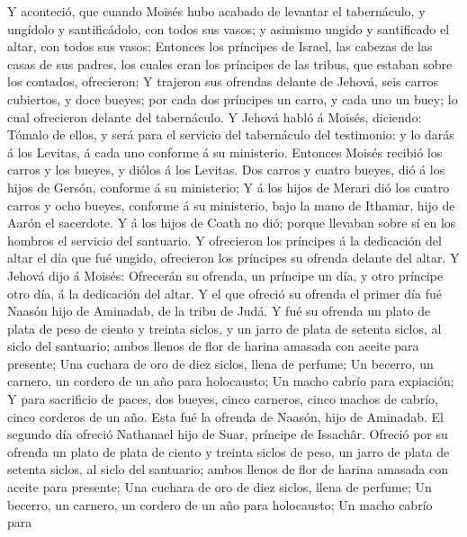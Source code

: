  Y aconteció, que cuando Moisés hubo acabado de levantar el
tabernáculo, y ungídolo y santificádolo, con todos sus vasos; y asimismo
ungido y santificado el altar, con todos sus vasos; 
Entonces los príncipes de Israel, las cabezas de las casas de sus
padres, los cuales eran los príncipes de las tribus, que estaban sobre
los contados, ofrecieron;  Y trajeron sus ofrendas delante
de Jehová, seis carros cubiertos, y doce bueyes; por cada dos príncipes
un carro, y cada uno un buey; lo cual ofrecieron delante del
tabernáculo.  Y Jehová habló á Moisés, diciendo:
 Tómalo de ellos, y será para el servicio del tabernáculo
del testimonio: y lo darás á los Levitas, á cada uno conforme á su
ministerio.  Entonces Moisés recibió los carros y los
bueyes, y diólos á los Levitas.  Dos carros y cuatro bueyes,
dió á los hijos de Gersón, conforme á su ministerio;  Y á
los hijos de Merari dió los cuatro carros y ocho bueyes, conforme á su
ministerio, bajo la mano de Ithamar, hijo de Aarón el sacerdote.
 Y á los hijos de Coath no dió; porque llevaban sobre sí en
los hombros el servicio del santuario.  Y ofrecieron los
príncipes á la dedicación del altar el día que fué ungido, ofrecieron
los príncipes su ofrenda delante del altar.  Y Jehová dijo
á Moisés: Ofrecerán su ofrenda, un príncipe un día, y otro príncipe otro
día, á la dedicación del altar.  Y el que ofreció su
ofrenda el primer día fué Naasón hijo de Aminadab, de la tribu de Judá.
 Y fué su ofrenda un plato de plata de peso de ciento y
treinta siclos, y un jarro de plata de setenta siclos, al siclo del
santuario; ambos llenos de flor de harina amasada con aceite para
presente;  Una cuchara de oro de diez siclos, llena de
perfume;  Un becerro, un carnero, un cordero de un año para
holocausto;  Un macho cabrío para expiación; 
Y para sacrificio de paces, dos bueyes, cinco carneros, cinco machos de
cabrío, cinco corderos de un año. Esta fué la ofrenda de Naasón, hijo de
Aminadab.  El segundo día ofreció Nathanael hijo de Suar,
príncipe de Issachâr.  Ofreció por su ofrenda un plato de
plata de ciento y treinta siclos de peso, un jarro de plata de setenta
siclos, al siclo del santuario; ambos llenos de flor de harina amasada
con aceite para presente;  Una cuchara de oro de diez
siclos, llena de perfume;  Un becerro, un carnero, un
cordero de un año para holocausto;  Un macho cabrío para
